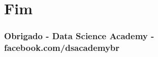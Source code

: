 \documentclass[11pt]{article}
\begin{document}
    \section{Fim}\label{fim}

    \subsubsection{Obrigado - Data Science Academy -
facebook.com/dsacademybr}\label{obrigado---data-science-academy---facebook.comdsacademybr}


    
    
    
    
\end{document}
